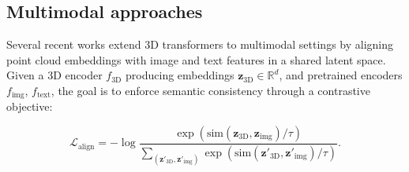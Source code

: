 

\subsection{Multimodal approaches}
\label{ssec:multimodal}

Several recent works extend 3D transformers to multimodal settings by aligning point cloud embeddings with image and text features in a shared latent space. Given a 3D encoder $f_{\text{3D}}$ producing embeddings $\mathbf{z}_{\text{3D}} \in \mathbb{R}^d$, and pretrained encoders $f_{\text{img}}$, $f_{\text{text}}$, the goal is to enforce semantic consistency through a contrastive objective:

\begin{equation}
  \mathcal{L}_{\text{align}} = 
  - \log 
  \frac{
    \exp\left(\text{sim}(\mathbf{z}_{\text{3D}}, \mathbf{z}_{\text{img}}) / \tau\right)
  }{
    \sum_{(\mathbf{z}'_{\text{3D}}, \mathbf{z}'_{\text{img}})}
    \exp\left(\text{sim}(\mathbf{z}'_{\text{3D}}, \mathbf{z}'_{\text{img}}) / \tau\right)
  }.
\end{equation}


